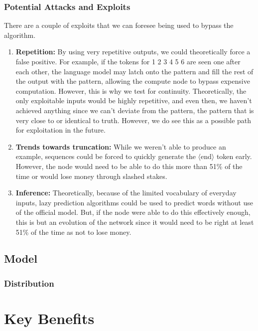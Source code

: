\documentclass{article}
\begin{document}
\subsubsection*{Potential Attacks and Exploits}

There are a couple of exploits that we can foresee being used to bypass the algorithm.

\begin{enumerate}
    \item \textbf{Repetition:} By using very repetitive outputs, we could theoretically force a false positive. 
    For example, if the tokens for 1 2 3 4 5 6 are seen one after each other, the language model may latch onto the pattern and fill the rest of the output with the pattern, allowing the compute node to bypass expensive computation. 
    However, this is why we test for continuity. 
    Theoretically, the only exploitable inputs would be highly repetitive, and even then, we haven't achieved anything since we can't deviate from the pattern, the pattern that is very close to or identical to truth. 
    However, we do see this as a possible path for exploitation in the future.
    \item \textbf{Trends towards truncation:} While we weren't able to produce an example, sequences could be forced to quickly generate the $\langle$end$\rangle$ token early. 
    However, the node would need to be able to do this more than 51\% of the time or would lose money through slashed stakes.
    \item \textbf{Inference:} Theoretically, because of the limited vocabulary of everyday inputs, lazy prediction algorithms could be used to predict words without use of the official model.
     But, if the node were able to do this effectively enough, this is but an evolution of the network since it would need to be right at least 51\% of the time as not to lose money.
\end{enumerate}

\subsection{Model}
\subsubsection{Distribution}

\section{Key Benefits}
\end{document}
